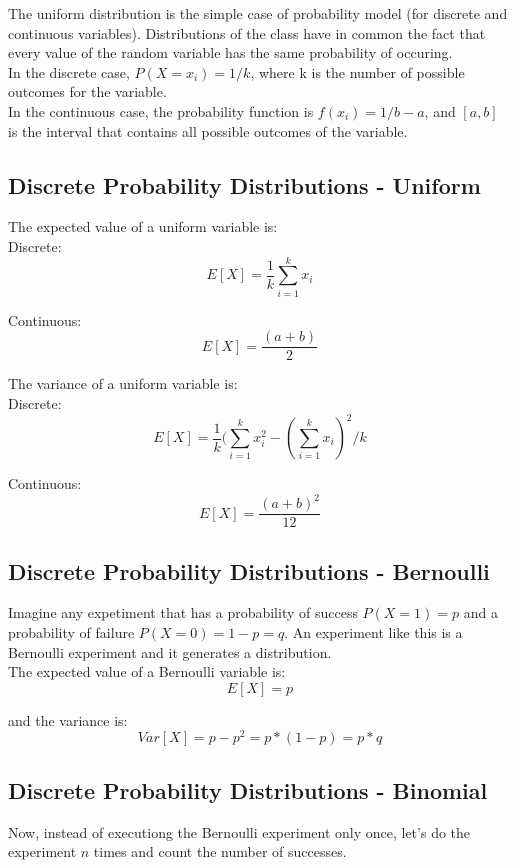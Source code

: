 \documentclass[11pt]{article}
\begin{document}
	The uniform distribution is the simple case of probability model (for discrete and continuous variables). Distributions of the class have in common the fact that every value of the random variable has the same probability of occuring.\\
	
	In the discrete case, $P(X=x_i) = 1/k$, where k is the number of possible outcomes for the variable.\\

	In the continuous case, the probability function is $f(x_i) = 1/b-a$, and $[a,b]$ is the interval that contains all possible outcomes of the variable.

	\subsection*{Discrete Probability Distributions - Uniform}
	The expected value of a uniform variable is:\\

	Discrete:
	\[E[X] = \frac{1}{k} \sum\limits_{i=1}^k x_i\]

	Continuous:
	\[E[X] = \frac{(a+b)}{2} \]

	The variance of a uniform variable is:\\
	
	Discrete:
	\[E[X] = \frac{1}{k} (\sum\limits_{i=1}^k x_i^2-(\sum\limits_{i=1}^k x_i)^2/k\]

	Continuous:
	\[E[X] = \frac{(a+b)^2}{12} \]

	\subsection*{Discrete Probability Distributions - Bernoulli}
	Imagine any expetiment that has a probability of success $P(X=1) = p$ and a probability of failure $P(X=0) = 1-p = q$. An experiment like this is a Bernoulli experiment and it generates a distribution.\\

		The expected value of a Bernoulli variable is:
		\[E[X] = p\]

		and the variance is:
		\[Var[X]=p-p^2= p*(1-p) = p*q\]

	\subsection*{Discrete Probability Distributions - Binomial}
	
	Now, instead of executiong the Bernoulli experiment only once, let's do the experiment $n$ times and count the number of successes.\\
\end{document}
